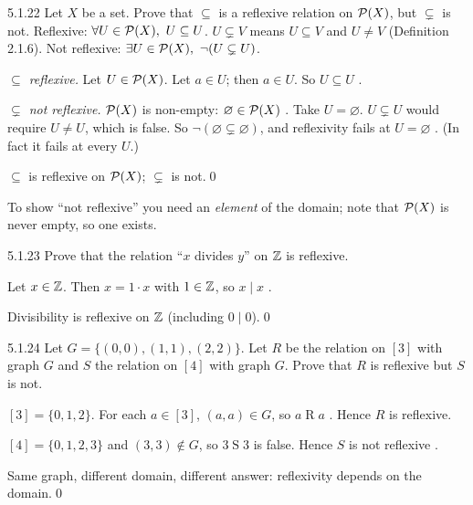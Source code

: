 \begin{bookex}[essential]{5.1.22}
Let $X$ be a set. Prove that $\subseteq$ is a reflexive relation on $\mathcal{P}(X)$, but $\subsetneq$ is not.
\solution
\given Reflexive: $\forall U\in\PS(X),\ U\subseteq U$. $U\subsetneq V$ means $U\subseteq V$ and $U\ne V$ (Definition 2.1.6). Not reflexive: $\exists U\in\mathcal{P}(X),\ \neg(U\subsetneq U)$.
\begin{steps}
\item \emph{$\subseteq$ reflexive.} Let $U\in\mathcal{P}(X)$. Let $a\in U$; then $a\in U$. So $U\subseteq U$ .
\item \emph{$\subsetneq$ not reflexive.} $\mathcal{P}(X)$ is non-empty: $\varnothing\in\mathcal{P}(X)$ . Take $U=\varnothing$. $U\subsetneq U$ would require $U\ne U$, which is false. So $\neg(\varnothing\subsetneq\varnothing)$, and reflexivity fails at $U=\varnothing$ . (In fact it fails at every $U$.)
\end{steps}
\conclusion $\subseteq$ is reflexive on $\mathcal{P}(X)$; $\subsetneq$ is not.\qed
\begin{compare}
\item To show ``not reflexive'' you need an \emph{element} of the domain; note that $\mathcal{P}(X)$ is never empty, so one exists.
\end{compare}
\end{bookex}

\begin{bookex}[essential]{5.1.23}
Prove that the relation ``$x$ divides $y$'' on $\mathbb{Z}$ is reflexive.
\solution
\begin{steps}
\item Let $x\in\mathbb{Z}$. Then $x=1\cdot x$ with $1\in\mathbb{Z}$, so $x\mid x$ .
\end{steps}
\conclusion Divisibility is reflexive on $\mathbb{Z}$ (including $0\mid0$).\qed
\end{bookex}

\begin{bookex}[recommended]{5.1.24}
Let $G=\{(0,0),(1,1),(2,2)\}$. Let $R$ be the relation on $[3]$ with graph $G$ and $S$ the relation on $[4]$ with graph $G$. Prove that $R$ is reflexive but $S$ is not.
\solution
\begin{steps}
\item $[3]=\{0,1,2\}$. For each $a\in[3]$, $(a,a)\in G$, so $a\mathrel Ra$ . Hence $R$ is reflexive.
\item $[4]=\{0,1,2,3\}$ and $(3,3)\notin G$, so $3\mathrel S3$ is false. Hence $S$ is not reflexive .
\end{steps}
\conclusion Same graph, different domain, different answer: reflexivity depends on the domain.\qed
\end{bookex}

